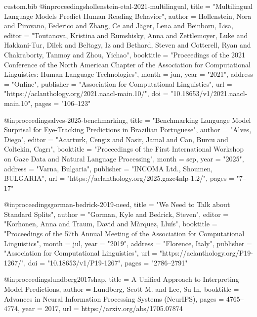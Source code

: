 \begin{filecontents*}[overwrite]{custom.bib}
@inproceedings{hollenstein-etal-2021-multilingual,
    title = "Multilingual Language Models Predict Human Reading Behavior",
    author = {Hollenstein, Nora  and
      Pirovano, Federico  and
      Zhang, Ce  and
      J{\"a}ger, Lena  and
      Beinborn, Lisa},
    editor = "Toutanova, Kristina  and
      Rumshisky, Anna  and
      Zettlemoyer, Luke  and
      Hakkani-Tur, Dilek  and
      Beltagy, Iz  and
      Bethard, Steven  and
      Cotterell, Ryan  and
      Chakraborty, Tanmoy  and
      Zhou, Yichao",
    booktitle = "Proceedings of the 2021 Conference of the North American Chapter of the Association for Computational Linguistics: Human Language Technologies",
    month = jun,
    year = "2021",
    address = "Online",
    publisher = "Association for Computational Linguistics",
    url = "https://aclanthology.org/2021.naacl-main.10/",
    doi = "10.18653/v1/2021.naacl-main.10",
    pages = "106--123"
}

@inproceedings{alves-2025-benchmarking,
    title = "Benchmarking Language Model Surprisal for Eye-Tracking Predictions in {B}razilian {P}ortuguese",
    author = "Alves, Diego",
    editor = "Acarturk, Cengiz  and
      Nasir, Jamal  and
      Can, Burcu  and
      Coltekin, Cagr{\i}",
    booktitle = "Proceedings of the First International Workshop on Gaze Data and Natural Language Processing",
    month = sep,
    year = "2025",
    address = "Varna, Bulgaria",
    publisher = "INCOMA Ltd., Shoumen, BULGARIA",
    url = "https://aclanthology.org/2025.gaze4nlp-1.2/",
    pages = "7--17"
}

@inproceedings{gorman-bedrick-2019-need,
    title = "We Need to Talk about Standard Splits",
    author = "Gorman, Kyle  and
      Bedrick, Steven",
    editor = "Korhonen, Anna  and
      Traum, David  and
      M{\`a}rquez, Llu{\'i}s",
    booktitle = "Proceedings of the 57th Annual Meeting of the Association for Computational Linguistics",
    month = jul,
    year = "2019",
    address = "Florence, Italy",
    publisher = "Association for Computational Linguistics",
    url = "https://aclanthology.org/P19-1267/",
    doi = "10.18653/v1/P19-1267",
    pages = "2786--2791"
}


@inproceedings{lundberg2017shap,
  title        = {A Unified Approach to Interpreting Model Predictions},
  author       = {Lundberg, Scott M. and Lee, Su-In},
  booktitle    = {Advances in Neural Information Processing Systems (NeurIPS)},
  pages        = {4765--4774},
  year         = {2017},
  url          = {https://arxiv.org/abs/1705.07874}
}


\end{filecontents*}
